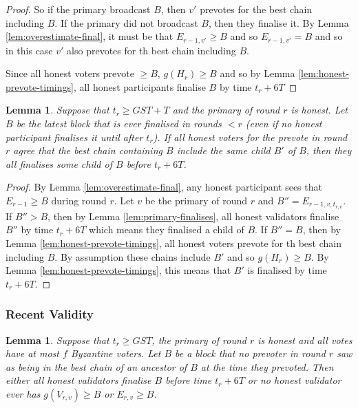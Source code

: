 \documentclass{article}
\newtheorem{lemma}[theorem]{Lemma}
\begin{document}
{\begin{proof}
So if the primary broadcast $B$, then $v'$ prevotes for the best chain including $B$. If the primary did not broadcast $B$, then they finalise it. By Lemma \ref{lem:overestimate-final}, it must be that $E_{r-1,v'} \geq B$ and so $E_{r-1,v'}=B$ and so in this case $v'$ also prevotes for th best chain including $B$.

Since all honest voters prevote $\geq B$, $g(H_r) \geq B$ and so by Lemma \ref{lem:honest-prevote-timings}, all honest participants finalise $B$ by time $t_r+6T$
\end{proof}



\begin{lemma}
 Suppose that $t_r \geq GST+T$ and the primary of round $r$ is honest. 
Let $B$ be the latest block that is ever finalised in rounds  $<r$ (even if no honest participant finalises it until after $t_r$). If all honest voters for the prevote in round $r$ agree that the best chain containing $B$ include the same child $B'$ of $B$, then they all finalises some child of $B$ before $t_r+6T$.
\end{lemma}

\begin{proof} By Lemma \ref{lem:overestimate-final}, any honest participant sees that $E_{r-1} \geq B$ during round $r$. Let $v$ be the primary of round $r$ and $B''=E_{r-1,v,t_{r,v}}$. If $B'' > B$, then by Lemma \ref{lem:primary-finalises}, all honest validators finalise $B''$ by time $t_r+6T$ which means they finalised a child of $B$. If $B''=B$, then by Lemma \ref{lem:honest-prevote-timings}, all honest voters prevote for th best chain including $B$. By assumption these chains include $B'$ and so $g(H_r) \geq B$. By Lemma \ref{lem:honest-prevote-timings}, this means that $B'$ is finalised by time $t_r+6T$.
\end{proof}







\subsubsection{Recent Validity}

\begin{lemma} \label{lem:honest-recent-validity}
Suppose that $t_r \geq GST$, the primary of round $r$ is honest and all votes have at most $f$ Byzantine voters. Let $B$ be a block that no prevoter in round $r$ saw as being in the best chain of an ancestor of $B$ at the time they prevoted. Then either all honest validators finalise $B$ before time $t_r+6T$ or no honest validator ever has $g(V_{r,v}) \geq B$ or $E_{r,v} \geq B$.
\end{lemma}

}
\end{document}
